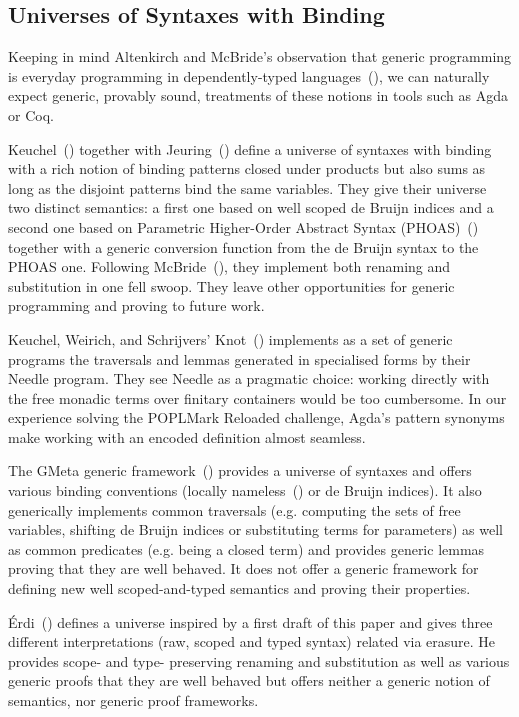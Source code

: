 \subsection{Universes of Syntaxes with Binding} Keeping in mind Altenkirch
and McBride's observation that generic programming is everyday programming
in dependently-typed languages~(\citeyear{DBLP:conf/ifip2-1/AltenkirchM02}),
we can naturally
expect generic, provably sound, treatments of these notions in tools such as
Agda or Coq.

Keuchel~(\citeyear{Keuchel:Thesis:2011}) together with
Jeuring~(\citeyear{DBLP:conf/icfp/KeuchelJ12})
define a universe of syntaxes with binding with a rich notion of binding
patterns closed under products but also sums as long as the disjoint
patterns bind the same variables.
%
They give their universe two distinct semantics: a first one based on well
scoped de Bruijn indices and a second one based on Parametric Higher-Order
Abstract Syntax (PHOAS)~(\cite{DBLP:conf/icfp/Chlipala08}) together with
a generic conversion function from the de Bruijn syntax to the PHOAS one.
%
Following McBride~(\citeyear{mcbride2005type}), they implement both renaming
and substitution in one fell swoop. They leave other
opportunities for generic programming and proving to future work.

Keuchel, Weirich, and Schrijvers' Knot~(\citeyear{needleandknot}) implements
as a set of generic programs the traversals and lemmas generated in specialised
forms by their Needle program. They see Needle as a pragmatic choice: working
directly with the free monadic terms over finitary containers would be too
cumbersome. In
our experience solving the POPLMark Reloaded challenge, Agda's pattern
synonyms make working with an encoded definition almost
seamless.

The GMeta generic framework~(\citeyear{gmeta}) provides a universe of syntaxes
and offers various binding conventions (locally nameless~(\cite{Chargueraud2012})
or de Bruijn indices).
%
It also generically implements common traversals (e.g. computing
the sets of free variables,
shifting
de Bruijn indices or substituting terms for parameters) as well as common
predicates (e.g. being a closed term) and provides generic lemmas proving that
they are well behaved. It does not offer a generic framework
for defining new well scoped-and-typed semantics and proving their properties.

Érdi~(\citeyear{gergodraft}) defines a universe inspired by a first draft of
this paper and gives three different interpretations (raw, scoped and
typed syntax) related via erasure.
%
He provides scope- and type- preserving renaming and
substitution as well as various generic proofs that they are well behaved but
offers neither a generic notion of semantics, nor generic proof frameworks.

